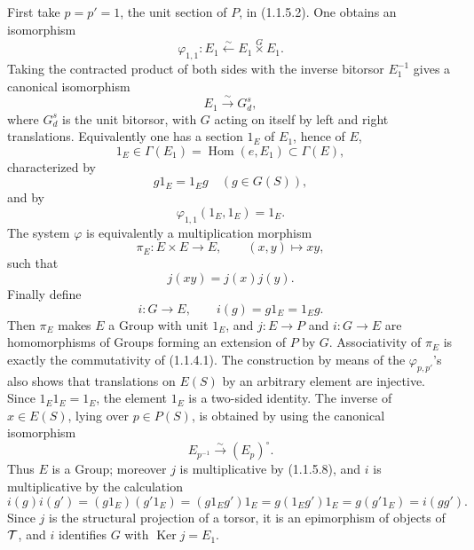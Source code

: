 \documentclass[11pt]{article}
\providecommand{\Ker}{\operatorname{Ker}}
\begin{document}
First take \(p=p'=1\), the unit section of \(P\), in (1.1.5.2).  One obtains an isomorphism
\begin{equation}\tag{1.1.5.3}
  \varphi_{1,1}:E_1\xleftarrow{\sim}E_1\overset{G}{\times}E_1.
\end{equation}
Taking the contracted product of both sides with the inverse bitorsor \(E_1^{-1}\) gives a canonical isomorphism
\begin{equation}\tag{1.1.5.4}
  E_1\xrightarrow{\sim}G_d^s,
\end{equation}
where \(G_d^s\) is the unit bitorsor, with \(G\) acting on itself by left and right translations.  Equivalently one has a section \(1_E\) of \(E_1\), hence of \(E\),
\begin{equation}\tag{1.1.5.5}
  1_E\in\Gamma(E_1)=\operatorname{Hom}(e,E_1)\subset\Gamma(E),
\end{equation}
characterized by
\[
  g1_E=1_Eg\quad(g\in G(S)),
\]
and by
\begin{equation}\tag{1.1.5.6}
  \varphi_{1,1}(1_E,1_E)=1_E.
\end{equation}
The system \(\varphi\) is equivalently a multiplication morphism
\begin{equation}\tag{1.1.5.7}
  \pi_E:E\times E\longrightarrow E,\qquad (x,y)\longmapsto xy,
\end{equation}
such that
\begin{equation}\tag{1.1.5.8}
  j(xy)=j(x)j(y).
\end{equation}
Finally define
\begin{equation}\tag{1.1.5.9}
  i:G\longrightarrow E,\qquad i(g)=g1_E=1_Eg.
\end{equation}
Then \(\pi_E\) makes \(E\) a Group with unit \(1_E\), and \(j:E\to P\) and \(i:G\to E\) are homomorphisms of Groups forming an extension of \(P\) by \(G\).  Associativity of \(\pi_E\) is exactly the commutativity of (1.1.4.1).  The construction by means of the \(\varphi_{p,p'}\)'s also shows that translations on \(E(S)\) by an arbitrary element are injective.  Since \(1_E1_E=1_E\), the element \(1_E\) is a two-sided identity.  The inverse of \(x\in E(S)\), lying over \(p\in P(S)\), is obtained by using the canonical isomorphism
\begin{equation}\tag{1.1.5.10}
  E_{p^{-1}}\xrightarrow{\sim}(E_p)^\circ.
\end{equation}
Thus \(E\) is a Group; moreover \(j\) is multiplicative by (1.1.5.8), and \(i\) is multiplicative by the calculation
\[
  i(g)i(g')=(g1_E)(g'1_E)=(g1_Eg')1_E=g(1_Eg')1_E=g(g'1_E)=i(gg').
\]
Since \(j\) is the structural projection of a torsor, it is an epimorphism of objects of \(\mathcal T\), and \(i\) identifies \(G\) with \(\Ker j=E_1\).
\end{document}
